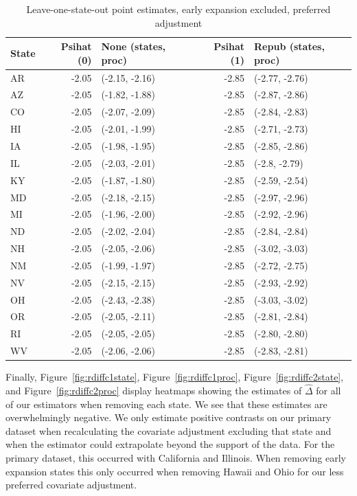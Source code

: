\begin{table}[ht]
\centering
   \caption{Leave-one-state-out point estimates, early expansion excluded, preferred adjustment}
    \label{tab:loostatec2}
\begin{tabular}{lrlrl}
  \toprule
State & Psihat (0) & None (states, proc) & Psihat (1) & Repub (states, proc) \\ 
  \midrule
AR & -2.05 & (-2.15, -2.16) & -2.85 & (-2.77, -2.76) \\ 
  AZ & -2.05 & (-1.82, -1.88) & -2.85 & (-2.87, -2.86) \\ 
  CO & -2.05 & (-2.07, -2.09) & -2.85 & (-2.84, -2.83) \\ 
  HI & -2.05 & (-2.01, -1.99) & -2.85 & (-2.71, -2.73) \\ 
  IA & -2.05 & (-1.98, -1.95) & -2.85 & (-2.85, -2.86) \\ 
  IL & -2.05 & (-2.03, -2.01) & -2.85 & (-2.8, -2.79) \\ 
  KY & -2.05 & (-1.87, -1.80) & -2.85 & (-2.59, -2.54) \\ 
  MD & -2.05 & (-2.18, -2.15) & -2.85 & (-2.97, -2.96) \\ 
  MI & -2.05 & (-1.96, -2.00) & -2.85 & (-2.92, -2.96) \\ 
  ND & -2.05 & (-2.02, -2.04) & -2.85 & (-2.84, -2.84) \\ 
  NH & -2.05 & (-2.05, -2.06) & -2.85 & (-3.02, -3.03) \\ 
  NM & -2.05 & (-1.99, -1.97) & -2.85 & (-2.72, -2.75) \\ 
  NV & -2.05 & (-2.15, -2.15) & -2.85 & (-2.93, -2.92) \\ 
  OH & -2.05 & (-2.43, -2.38) & -2.85 & (-3.03, -3.02) \\ 
  OR & -2.05 & (-2.05, -2.11) & -2.85 & (-2.81, -2.84) \\ 
  RI & -2.05 & (-2.05, -2.05) & -2.85 & (-2.80, -2.80) \\ 
  WV & -2.05 & (-2.06, -2.06) & -2.85 & (-2.83, -2.81) \\ 
   \bottomrule
\end{tabular}
\end{table}

Finally, Figure~\ref{fig:rdiffc1state}, Figure~\ref{fig:rdiffc1proc}, Figure~\ref{fig:rdiffc2state}, and Figure~\ref{fig:rdiffc2proc} display heatmaps showing the estimates of $\hat{\Delta}$ for all of our estimators when removing each state. We see that these estimates are overwhelmingly negative. We only estimate positive contrasts on our primary dataset when recalculating the covariate adjustment excluding that state and when the estimator could extrapolate beyond the support of the data. For the primary dataset, this occurred with California and Illinois. When removing early expansion states this only occurred when removing Hawaii and Ohio for our less preferred covariate adjustment.

